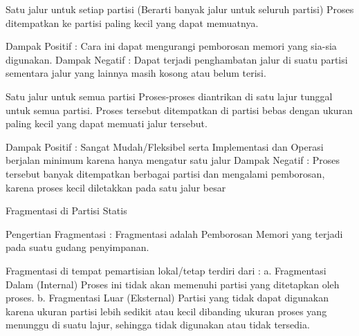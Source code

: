 Satu jalur untuk setiap partisi (Berarti banyak jalur untuk seluruh partisi) Proses ditempatkan ke partisi paling kecil yang dapat memuatnya.

Dampak Positif : Cara ini dapat mengurangi pemborosan memori yang sia-sia digunakan.
Dampak Negatif : Dapat terjadi penghambatan jalur di suatu partisi sementara jalur yang lainnya masih kosong atau belum terisi.

Satu jalur untuk semua partisi
Proses-proses diantrikan di satu lajur tunggal untuk semua partisi. Proses tersebut ditempatkan di partisi bebas dengan ukuran paling kecil
yang dapat memuati jalur tersebut.

Dampak Positif : Sangat Mudah/Fleksibel serta Implementasi dan Operasi berjalan minimum karena hanya mengatur satu jalur
Dampak Negatif : Proses tersebut banyak ditempatkan berbagai partisi dan mengalami pemborosan, karena proses kecil diletakkan pada satu jalur besar

Fragmentasi di Partisi Statis

Pengertian Fragmentasi :
Fragmentasi adalah Pemborosan Memori yang terjadi pada suatu gudang penyimpanan.

Fragmentasi di tempat pemartisian lokal/tetap terdiri dari :
a. Fragmentasi Dalam (Internal)
Proses ini tidak akan memenuhi partisi yang ditetapkan oleh proses.
b. Fragmentasi Luar (Eksternal)
Partisi yang tidak dapat digunakan karena ukuran partisi lebih sedikit atau kecil dibanding ukuran proses yang menunggu di suatu lajur,
sehingga tidak digunakan atau tidak tersedia.
